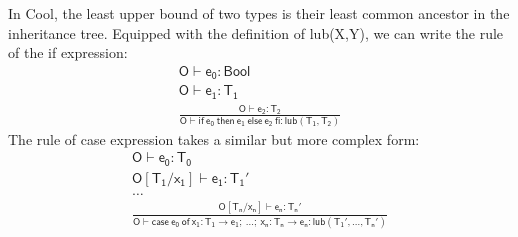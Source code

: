 In Cool, the least upper bound of two types is their least common ancestor in the inheritance tree. Equipped with the definition of lub(X,Y), we can write the rule of the if expression:
\begin{gather*}
\mathsf{O\vdash e_0: Bool}\\
\mathsf{O\vdash e_1: T_1}\\
\mathsf{\frac{O\vdash e_2:T_2}{ O\vdash if\:e_0\:then\:e_1\:else\:e_2\:fi:lub(T_1, T_2)}}
\end{gather*}
The rule of case expression takes a similar but more complex form:
\begin{gather*}
\mathsf{O\vdash e_0:T_0}\\
\mathsf{O[T_1/x_1]\vdash e_1:T_1'}\\
\dots\\
\mathsf{\frac{O[T_n/x_n]\vdash e_n:T_n'}{O\vdash case\:e_0\:of\:x_1:T_1\rightarrow e_1;\:\dots;\: x_n:T_n\rightarrow e_n: lub(T_1',\dots,T_n')}}
\end{gather*}
